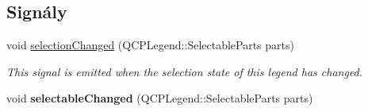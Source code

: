 \subsection*{Signály}
\begin{DoxyCompactItemize}
\item 
void \hyperlink{classQCPLegend_a82c88464edac07a9eefaf3906268df3b}{selection\+Changed} (Q\+C\+P\+Legend\+::\+Selectable\+Parts parts)
\begin{DoxyCompactList}\small\item\em This signal is emitted when the selection state of this legend has changed. \end{DoxyCompactList}\item 
\hypertarget{classQCPLegend_a8a77300fd0976d6bdd8000f4e8d114b8}{}void {\bfseries selectable\+Changed} (Q\+C\+P\+Legend\+::\+Selectable\+Parts parts)\label{classQCPLegend_a8a77300fd0976d6bdd8000f4e8d114b8}

\end{DoxyCompactItemize}
